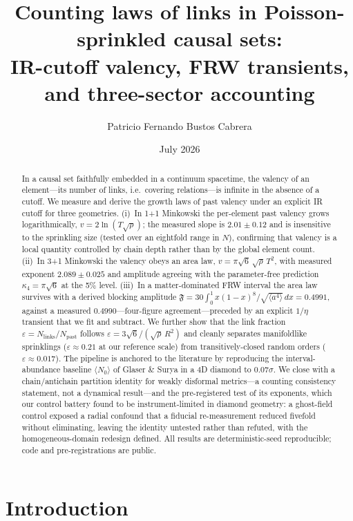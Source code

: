 \documentclass[11pt,a4paper]{article}
\title{Counting laws of links in Poisson-sprinkled causal sets:\\
IR-cutoff valency, FRW transients, and three-sector accounting}
\author{Patricio Fernando Bustos Cabrera}
\date{July 2026}
\begin{document}
\maketitle

\begin{abstract}
In a causal set faithfully embedded in a continuum spacetime, the valency of an
element---its number of links, i.e.\ covering relations---is infinite in the
absence of a cutoff. We measure and derive the growth laws of past valency
under an explicit IR cutoff for three geometries. (i)~In 1+1 Minkowski the
per-element past valency grows logarithmically, $v = 2\ln(T\sqrt{\rho})$; the
measured slope is $2.01 \pm 0.12$ and is insensitive to the sprinkling size
(tested over an eightfold range in $N$), confirming that valency is a local
quantity controlled by chain depth rather than by the global element count.
(ii)~In 3+1 Minkowski the valency obeys an area law,
$v = \pi\sqrt{6}\,\sqrt{\rho}\,T^{2}$, with measured exponent
$2.089 \pm 0.025$ and amplitude agreeing with the parameter-free prediction
$\kappa_{4}=\pi\sqrt{6}$ at the 5\% level. (iii)~In a matter-dominated FRW
interval the area law survives with a derived blocking amplitude
$\mathfrak{F} = 30\int_{0}^{1} x(1-x)^{8}/\sqrt{\langle a^{4}\rangle}\,dx
= 0.4991$, against a measured $0.4990$---four-figure agreement---preceded by
an explicit $1/\eta$ transient that we fit and subtract. We further show that
the link fraction $\varepsilon = N_{\mathrm{links}}/N_{\mathrm{past}}$ follows
$\varepsilon = 3\sqrt{6}/(\sqrt{\rho}\,R^{2})$ and cleanly separates
manifoldlike sprinklings ($\varepsilon \approx 0.21$ at our reference scale)
from transitively-closed random orders ($\varepsilon \approx 0.017$). The
pipeline is anchored to the literature by reproducing the interval-abundance
baseline $\langle N_{0}\rangle$ of Glaser \& Surya in a 4D diamond to
$0.07\sigma$. We close with a chain/antichain partition identity for weakly
disformal metrics---a counting consistency statement, not a dynamical
result---and the pre-registered test of its exponents, which our control
battery found to be instrument-limited in diamond geometry: a ghost-field
control exposed a radial confound that a fiducial re-measurement reduced
fivefold without eliminating, leaving the identity untested rather than
refuted, with the homogeneous-domain redesign defined. All results are
deterministic-seed reproducible; code and pre-registrations are public.
\end{abstract}

\section{Introduction}
\end{document}
